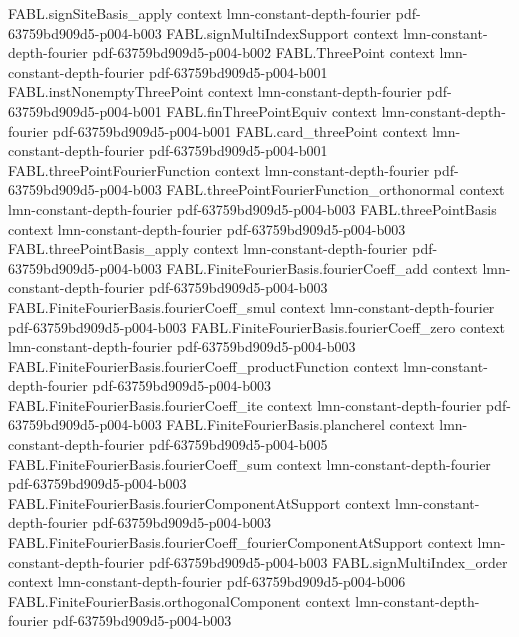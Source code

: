 \begin{theorem}
\proofstep
  {FABL.signSiteBasis_apply}
  {context}
  {lmn-constant-depth-fourier}
  {pdf-63759bd909d5-p004-b003}
\proofstep
  {FABL.signMultiIndexSupport}
  {context}
  {lmn-constant-depth-fourier}
  {pdf-63759bd909d5-p004-b002}
\proofstep
  {FABL.ThreePoint}
  {context}
  {lmn-constant-depth-fourier}
  {pdf-63759bd909d5-p004-b001}
\proofstep
  {FABL.instNonemptyThreePoint}
  {context}
  {lmn-constant-depth-fourier}
  {pdf-63759bd909d5-p004-b001}
\proofstep
  {FABL.finThreePointEquiv}
  {context}
  {lmn-constant-depth-fourier}
  {pdf-63759bd909d5-p004-b001}
\proofstep
  {FABL.card_threePoint}
  {context}
  {lmn-constant-depth-fourier}
  {pdf-63759bd909d5-p004-b001}
\proofstep
  {FABL.threePointFourierFunction}
  {context}
  {lmn-constant-depth-fourier}
  {pdf-63759bd909d5-p004-b003}
\proofstep
  {FABL.threePointFourierFunction_orthonormal}
  {context}
  {lmn-constant-depth-fourier}
  {pdf-63759bd909d5-p004-b003}
\proofstep
  {FABL.threePointBasis}
  {context}
  {lmn-constant-depth-fourier}
  {pdf-63759bd909d5-p004-b003}
\proofstep
  {FABL.threePointBasis_apply}
  {context}
  {lmn-constant-depth-fourier}
  {pdf-63759bd909d5-p004-b003}
\proofstep
  {FABL.FiniteFourierBasis.fourierCoeff_add}
  {context}
  {lmn-constant-depth-fourier}
  {pdf-63759bd909d5-p004-b003}
\proofstep
  {FABL.FiniteFourierBasis.fourierCoeff_smul}
  {context}
  {lmn-constant-depth-fourier}
  {pdf-63759bd909d5-p004-b003}
\proofstep
  {FABL.FiniteFourierBasis.fourierCoeff_zero}
  {context}
  {lmn-constant-depth-fourier}
  {pdf-63759bd909d5-p004-b003}
\proofstep
  {FABL.FiniteFourierBasis.fourierCoeff_productFunction}
  {context}
  {lmn-constant-depth-fourier}
  {pdf-63759bd909d5-p004-b003}
\proofstep
  {FABL.FiniteFourierBasis.fourierCoeff_ite}
  {context}
  {lmn-constant-depth-fourier}
  {pdf-63759bd909d5-p004-b003}
\proofstep
  {FABL.FiniteFourierBasis.plancherel}
  {context}
  {lmn-constant-depth-fourier}
  {pdf-63759bd909d5-p004-b005}
\proofstep
  {FABL.FiniteFourierBasis.fourierCoeff_sum}
  {context}
  {lmn-constant-depth-fourier}
  {pdf-63759bd909d5-p004-b003}
\proofstep
  {FABL.FiniteFourierBasis.fourierComponentAtSupport}
  {context}
  {lmn-constant-depth-fourier}
  {pdf-63759bd909d5-p004-b003}
\proofstep
  {FABL.FiniteFourierBasis.fourierCoeff_fourierComponentAtSupport}
  {context}
  {lmn-constant-depth-fourier}
  {pdf-63759bd909d5-p004-b003}
\proofstep
  {FABL.signMultiIndex_order}
  {context}
  {lmn-constant-depth-fourier}
  {pdf-63759bd909d5-p004-b006}
\proofstep
  {FABL.FiniteFourierBasis.orthogonalComponent}
  {context}
  {lmn-constant-depth-fourier}
  {pdf-63759bd909d5-p004-b003}

\end{theorem}
